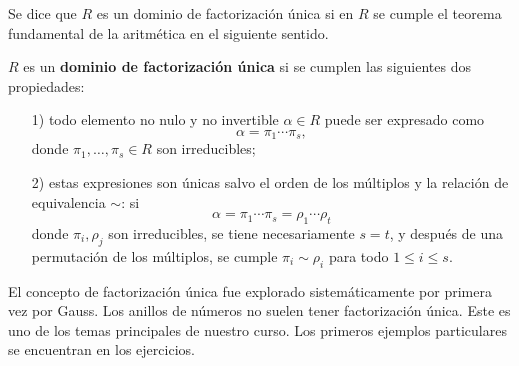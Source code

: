 Se dice que $R$ es un dominio de factorización única si en $R$ se cumple el
teorema fundamental de la aritmética en el siguiente sentido.

\begin{definicion}
  $R$ es un \textbf{dominio de factorización única} si se cumplen las siguientes
  dos propiedades:
  \begin{enumerate}
  \item[1)] todo elemento no nulo y no invertible $\alpha\in R$ puede ser
    expresado como
    $$\alpha = \pi_1\cdots \pi_s,$$
    donde $\pi_1,\ldots,\pi_s\in R$ son irreducibles;

  \item[2)] estas expresiones son únicas salvo el orden de los múltiplos y la
    relación de equivalencia $\sim$: si
    $$\alpha = \pi_1\cdots \pi_s = \rho_1\cdots \rho_t$$
    donde $\pi_i, \rho_j$ son irreducibles, se tiene necesariamente $s = t$, y
    después de una permutación de los múltiplos, se cumple $\pi_i \sim \rho_i$
    para todo $1 \le i \le s$.
  \end{enumerate}
\end{definicion}

El concepto de factorización única fue explorado sistemáticamente por primera
vez por Gauss. Los anillos de números no suelen tener factorización única. Este
es uno de los temas principales de nuestro curso. Los primeros ejemplos
particulares se encuentran en los ejercicios.

